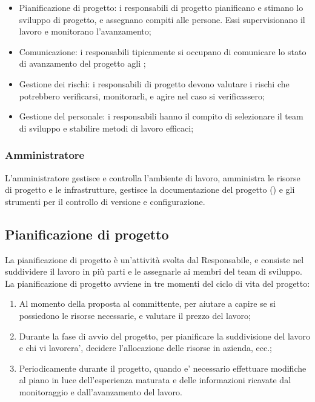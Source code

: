 \begin{itemize}
  \item Pianificazione di progetto: i responsabili di progetto pianificano e
    stimano lo sviluppo di progetto, e assegnano compiti alle persone. Essi
    supervisionano il lavoro e monitorano l'avanzamento;
  \item Comunicazione: i responsabili tipicamente si occupano di comunicare lo
    stato di avanzamento del progetto agli ;
  \item Gestione dei rischi: i responsabili di progetto devono valutare i
    rischi che potrebbero verificarsi, monitorarli, e agire nel caso si
    verificassero;
  \item Gestione del personale: i responsabili hanno il compito di selezionare
    il team di sviluppo e stabilire metodi di lavoro efficaci;
\end{itemize}

\subsubsection{Amministratore}

L'amministratore gestisce e controlla l'ambiente di lavoro, amministra le
risorse di progetto e le infrastrutture, gestisce la documentazione del progetto
() e gli strumenti per il controllo di versione e
configurazione.

\subsection{Pianificazione di progetto}

La pianificazione di progetto è un'attività svolta dal Responsabile, e consiste
nel suddividere il lavoro in più parti e le assegnarle ai membri del team di
sviluppo. La pianificazione di progetto avviene in tre momenti del ciclo di vita
del progetto:

\begin{enumerate}
  \item Al momento della proposta al committente, per aiutare a capire se si
    possiedono le risorse necessarie, e valutare il prezzo del lavoro;
  \item Durante la fase di avvio del progetto, per pianificare la suddivisione
    del lavoro e chi vi lavorera', decidere l'allocazione delle risorse in
    azienda, ecc.;
  \item Periodicamente durante il progetto, quando e' necessario effettuare
    modifiche al piano in luce dell'esperienza maturata e delle informazioni
    ricavate dal monitoraggio e dall'avanzamento del lavoro.
\end{enumerate}

